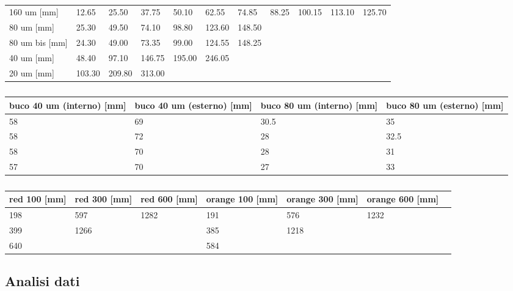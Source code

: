\begin{table}
    \centering
    \footnotesize
	\begin{tabular}{ l | l l l l l l l l l l }
		\toprule
		160 um [mm]    & 12.65  & 25.50  & 37.75  & 50.10  & 62.55  & 74.85  & 88.25 & 100.15 & 113.10 & 125.70 \\
		80 um [mm]     & 25.30  & 49.50  & 74.10  & 98.80  & 123.60 & 148.50 &       &        &        &        \\
		80 um bis [mm] & 24.30  & 49.00  & 73.35  & 99.00  & 124.55 & 148.25 &       &        &        &        \\
		40 um [mm]     & 48.40  & 97.10  & 146.75 & 195.00 & 246.05 &        &       &        &        &        \\
		20 um [mm]     & 103.30 & 209.80 & 313.00 &        &        &        &       &        &        &        \\
		\bottomrule
	\end{tabular}
	\caption{}
	\label{tab:}
\end{table}


\begin{table}
    \centering
    \footnotesize
    \begin{tabular}{l l l l}
        \toprule
        buco 40 um (interno) [mm]&      buco 40 um (esterno) [mm]&      buco 80 um (interno) [mm]&      buco 80 um (esterno) [mm]\\
        \midrule
        58&                             69&                             30.5&                           35\\
        58&                             72&                             28&                             32.5\\
        58&                             70&                             28&                             31\\
        57&                             70&                             27&                             33\\
        \bottomrule
    \end{tabular}
    \caption{}
    \label{tab:foro}
\end{table}

\begin{table}
    \centering
    \footnotesize
    \begin{tabular}{l l l l l l l}
        \toprule
        red 100 [mm]&   red 300 [mm]&   red 600 [mm]&   orange 100 [mm]&    orange 300 [mm]&    orange 600 [mm]&\\
        \midrule
        198&            597&            1282&           191&                576&                1232&\\
        399&            1266&           &              385&                1218&               &\\
        640&            &              &              584&                &                  &\\
        \bottomrule
    \end{tabular}
    \caption{}
    \label{tab:reticolo}
\end{table}

\subsection{Analisi dati}


